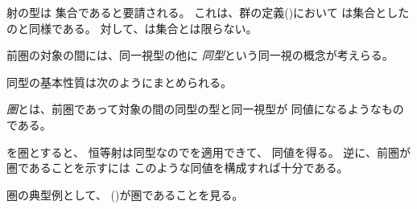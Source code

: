 \documentclass[index]{subfiles}
\begin{document}



射の型は
集合であると要請される。
これは、群の定義()において
\myInlineMath{\myGroupCarrier}は集合としたのと同様である。
対して、\myInlineMath{\myCatObj}は集合とは限らない。





前圏の対象の間には、同一視型の他に
\emph{同型}という同一視の概念が考えらる。






同型の基本性質は次のようにまとめられる。



\emph{圏}とは、前圏であって対象の間の同型の型と同一視型が
同値になるようなものである。



を圏とすると、
恒等射は同型なのでを適用できて、
同値を得る。
逆に、前圏が圏であることを示すには
このような同値を構成すれば十分である。

圏の典型例として、
 ()が圏であることを見る。



  
\end{document}
